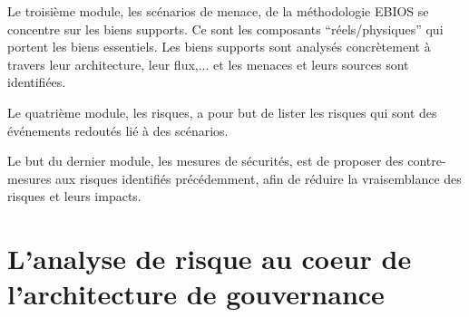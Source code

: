Le troisième module, les scénarios de menace, de la méthodologie EBIOS se concentre sur les biens supports. Ce sont les composants “réels/physiques” qui portent les biens essentiels. Les biens supports sont analysés concrètement à travers leur architecture, leur flux,... et les menaces et leurs sources sont identifiées.

Le quatrième module, les risques, a pour but de lister les risques qui sont des événements redoutés lié à des scénarios.

Le but du dernier module, les mesures de sécurités, est de proposer des contre-mesures aux risques identifiés précédemment, afin de réduire la vraisemblance des risques et leurs impacts.

\section{L'analyse de risque au coeur de l'architecture de gouvernance}


\utodo


%
%
%
%
%
%
%
%
%
%


